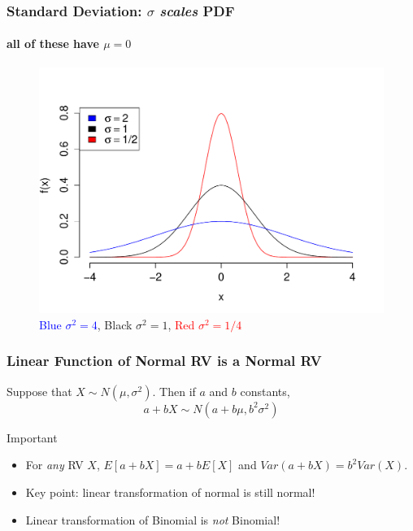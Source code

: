 \documentclass[handout]{beamer}
\begin{document}


\begin{frame}
  \frametitle{Standard Deviation: $\sigma$ \emph{scales} PDF}
\framesubtitle{all of these have $\mu=0$}

\begin{figure}
\includegraphics[scale = 0.5]{./images/normal_std_devs}
\caption{\textcolor{blue}{Blue $\sigma^2 = 4$},
Black $\sigma^2=1$,
\textcolor{red}{Red $\sigma^2= 1/4$}}
\end{figure}
\end{frame}



\begin{frame}
\frametitle{Linear Function of Normal RV is a Normal RV}


Suppose that $X \sim N(\mu, \sigma^2)$. Then if $a$ and $b$ constants,
$$\boxed{a + bX \sim N(a + b\mu, b^2 \sigma^2)}$$

\begin{block}{Important}
	\begin{itemize}
    \item  For \emph{any} RV $X$, $E[a + bX] = a +bE[X]$ and $Var(a +bX) = b^2 Var(X)$.
		\item Key point: linear transformation of normal is still normal!
    \item Linear transformation of Binomial is \emph{not} Binomial!
	\end{itemize}
\end{block}

\end{frame}
\end{document}
